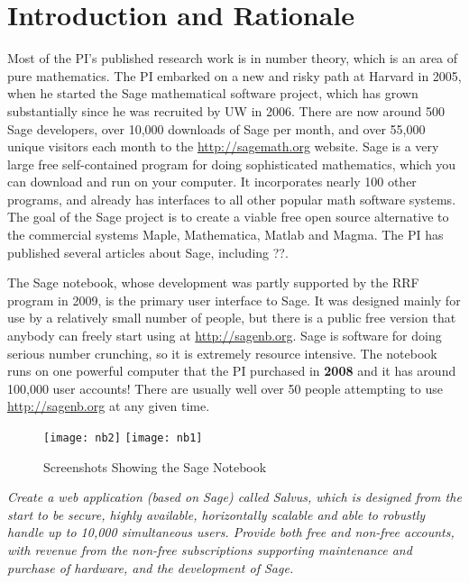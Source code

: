 \documentclass[11pt]{article}
\begin{document}
\section{Introduction and Rationale}


Most of the PI's published research work is in number theory, which is
an area of pure mathematics.  The PI embarked on a new and risky path
at Harvard in 2005, when he started the Sage mathematical software
project, which has grown substantially since he was recruited by UW in
2006.  There are now around 500 Sage developers, over 10,000 downloads
of Sage per month, and over 55,000 unique visitors each month to the
\url{http://sagemath.org} website.  Sage is a very large free
self-contained program for doing sophisticated mathematics, which you
can download and run on your computer.  It incorporates nearly 100
other programs, and already has interfaces to all other popular math
software systems.  The goal of the Sage project is to create a viable
free open source alternative to the commercial systems Maple,
Mathematica, Matlab and Magma.  The PI has published several articles
about Sage, including \cite{} ??.

The Sage notebook, whose development was partly supported by the RRF
program in 2009, is the primary user interface to Sage.  It was
designed mainly for use by a relatively small number of people, but
there is a public free version that anybody can freely start using at
\url{http://sagenb.org}.  Sage is software for doing serious number
crunching, so it is extremely resource intensive.  The notebook runs
on one powerful computer that the PI purchased in {\bf 2008} and it
has around 100,000 user accounts!  There are usually well over 50
people attempting to use \url{http://sagenb.org} at any given time.

\begin{center}
\begin{figure}[ht]
\hfill
\texttt{[image: nb2]}
\hfill
\texttt{[image: nb1]}
\hfill
\mbox{}
\caption{Screenshots Showing the Sage Notebook\label{fig:sagenb}}
\end{figure}
\end{center}

 {\em Create a web application (based on Sage)
  called Salvus, which is designed from the start to be secure, highly
  available, horizontally scalable and able to robustly handle up to
  10,000 simultaneous users.  Provide both free and non-free accounts,
  with revenue from the non-free subscriptions supporting maintenance
  and purchase of hardware, and the development of Sage.}
\end{document}
